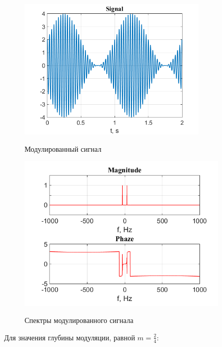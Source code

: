 \documentclass[a4paper,14pt]{article}
\begin{document}
\begin{figure}[h]
\begin{multicols}{1}
\hfill
\includegraphics[width=90mm]{am1}
\hfill
\caption{Модулированный сигнал}
\label{figBottom}
\hfill
\includegraphics[width=100mm]{am1_spec}
\hfill
\caption{Спектры модулированного сигнала}
\label{figDown}
\end{multicols}
\end{figure}


Для значения глубины модуляции, равной $ m = \frac{2}{4} $:
\end{document}
